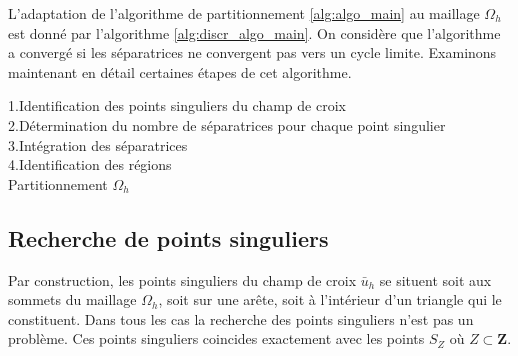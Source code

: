 L'adaptation de l'algorithme de partitionnement \ref{alg:algo_main} au maillage $\Omega_h$ est donné par l'algorithme \ref{alg:discr_algo_main}. On considère que l'algorithme a convergé si les séparatrices ne convergent pas vers un cycle limite. Examinons maintenant en détail certaines étapes de cet algorithme.

\vspace{0.5cm}
\begin{algorithm}[h!]
\label{alg:discr_algo_main}
\renewcommand{\algorithmcfname}{Algorithme}%
\SetAlgoLined
{}
\vspace{0.2cm}
1.\quad Identification des points singuliers du champ de croix\\[0.2cm]
2.\quad Détermination du nombre de séparatrices pour chaque point singulier\\[0.2cm]
3.\quad Intégration des séparatrices\\[0.2cm]
4.\quad Identification des régions\\[0.2cm]
\caption{Partitionnement $\Omega_h$}
\end{algorithm}
\vspace{0.5cm}

\subsection{Recherche de points singuliers}

Par construction, les points singuliers du champ de croix $\bar{u}_h$ se situent soit aux sommets du maillage $\Omega_h$, soit sur une arête, soit à l'intérieur d'un triangle qui le constituent. Dans tous les cas la recherche des points singuliers n'est pas un problème. Ces points singuliers coincides exactement avec les points $S_Z$ où $Z\subset\mathbf{Z}$.

